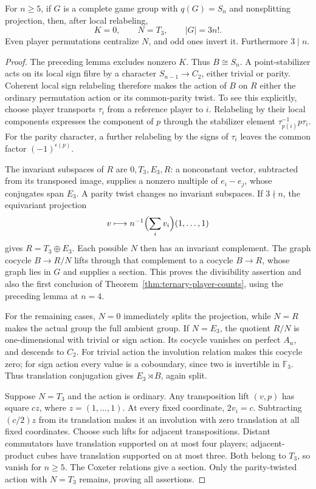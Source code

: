 \begin{lemma}\label{lem:ternary-residual-extension}
For $n\geq5$, if $G$ is a complete game group with $q(G)=S_n$ and
nonsplitting projection, then, after local relabeling,
\[
 K=0,\qquad N=T_3,\qquad |G|=3n!.
\]
Even player permutations centralize $N$, and odd ones invert it.
Furthermore $3\mid n$.
\end{lemma}
\begin{proof}
The preceding lemma excludes nonzero $K$. Thus $B\cong S_n$. A
point-stabilizer acts on its local sign fibre by a character
$S_{n-1}\to C_2$, either trivial or parity. Coherent local sign
relabeling therefore makes the action of $B$ on $R$ either the ordinary
permutation action or its common-parity twist. To see this explicitly,
choose player transports $\tau_i$ from a reference player to $i$.
Relabeling by their local components expresses the component of $p$
through the stabilizer element $\tau_{p(i)}^{-1}p\tau_i$. For the parity
character, a further relabeling by the signs of $\tau_i$ leaves the common
factor $(-1)^{\epsilon(p)}$.

The invariant subspaces of $R$ are $0,T_3,E_3,R$: a nonconstant vector,
subtracted from its transposed image, supplies a nonzero multiple of
$e_i-e_j$, whose conjugates span $E_3$. A parity twist changes no invariant
subspaces. If $3\nmid n$, the equivariant projection
\[
 v\longmapsto n^{-1}\Bigl(\sum_i v_i\Bigr)(1,\ldots,1)
\]
gives $R=T_3\oplus E_3$. Each possible $N$ then has an invariant
complement. The graph cocycle $B\to R/N$ lifts through that complement
to a cocycle $B\to R$, whose graph lies in $G$ and supplies a section.
This proves the divisibility assertion and also the first conclusion of
Theorem~\ref{thm:ternary-player-counts}, using the preceding lemma at $n=4$.

For the remaining cases, $N=0$ immediately splits the projection, while
$N=R$ makes the actual group the full ambient group. If $N=E_3$, the
quotient $R/N$ is one-dimensional with trivial or sign action. Its cocycle
vanishes on perfect $A_n$, and descends to $C_2$. For trivial action the
involution relation makes this cocycle zero; for sign action every value
is a coboundary, since two is invertible in $\mathbb F_3$. Thus translation
conjugation gives $E_3\rtimes B$, again split.

Suppose $N=T_3$ and the action is ordinary. Any transposition lift
$(v,p)$ has square $cz$, where $z=(1,\ldots,1)$. At every fixed
coordinate, $2v_i=c$. Subtracting $(c/2)z$ from its translation makes it
an involution with zero translation at all fixed coordinates. Choose such
lifts for adjacent transpositions. Distant commutators have translation
supported on at most four players; adjacent-product cubes have translation
supported on at most three. Both belong to $T_3$, so vanish for $n\geq5$.
The Coxeter relations give a section. Only the parity-twisted action with
$N=T_3$ remains, proving all assertions.
\end{proof}

